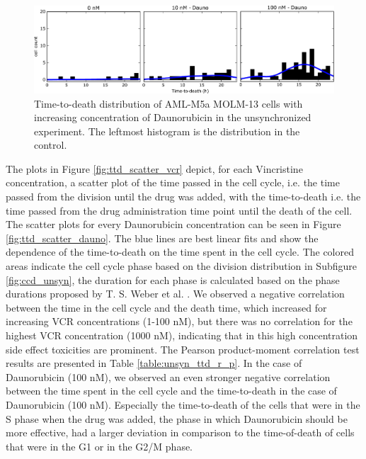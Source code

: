 \documentclass[pdftex,12pt,a4paper]{report}
\begin{document}
\begin{figure}[H]
\centering
\includegraphics[width=\textwidth]{images/ttd/unsyn/dauno_all.pdf}
\caption[Distribution of TTD for every Daunorubicin concentration in the unsynchronized experiment]{Time-to-death distribution of AML-M5a MOLM-13 cells with increasing concentration of Daunorubicin in the unsynchronized experiment. The leftmost histogram is the distribution in the control.}
\label{fig:ttd_hist_dauno}
\end{figure}

The plots in Figure \ref{fig:ttd_scatter_vcr} depict, for each Vincristine concentration, a scatter plot of the time passed in the cell cycle, i.e. the time passed from the division until the drug was added, with the time-to-death i.e. the time passed from the drug administration time point until the death of the cell. The scatter plots for every Daunorubicin concentration can be seen in Figure \ref{fig:ttd_scatter_dauno}.  The blue lines are best linear fits and show the dependence of the time-to-death on the time spent in the cell cycle. The colored areas indicate the cell cycle phase based on the division distribution in Subfigure \ref{fig:ccd_unsyn}, the duration for each phase is calculated based on the phase durations proposed by T. S. Weber et al. \cite{weber2014quantifying}. We observed a negative correlation between the time in the cell cycle and the death time, which increased for increasing VCR concentrations (1-100 nM), but there was no correlation for the highest VCR concentration (1000 nM), indicating that in this high concentration side effect toxicities are prominent. The Pearson product-moment correlation test results are presented in Table \ref{table:unsyn_ttd_r_p}. In the case of Daunorubicin (100 nM), we observed an even stronger negative correlation between the time spent in the cell cycle and the time-to-death in the case of Daunorubicin (100 nM). Especially the time-to-death of the cells that were in the S phase when the drug was added, the phase in which Daunorubicin should be more effective, had a larger deviation in comparison to the time-of-death of cells that were in the G1 or in the G2/M phase.
\end{document}
